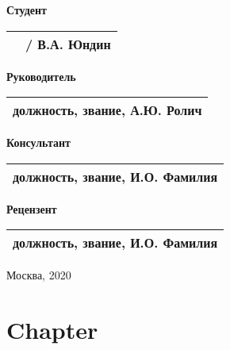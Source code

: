 \documentclass[a4paper,14pt]{extreport} %
\begin{document}
	\begin{multicols}{2}
		\noindent
		\textbf{Студент}
		
		\vspace{4mm}
		
		\noindent
		\begin{tabularx}{\linewidth}{Xc}
			& / В.А. Юндин \\
			\hline
		\end{tabularx}
		
		\columnbreak
		
		\noindent
		\textbf{Руководитель}
		
		\vspace{4mm}
		
		\noindent
		\begin{tabularx}{\linewidth}{c}
			должность, звание, А.Ю. Ролич \\
			\hline
		\end{tabularx}
	
		\vspace{8mm}
	
		\noindent
		\textbf{Консультант}
		
		\vspace{4mm}
		
		\noindent
		\begin{tabularx}{\linewidth}{c}
			должность, звание, И.О. Фамилия \\
			\hline
		\end{tabularx}
	
		\vspace{8mm}
		
		\noindent
		\textbf{Рецензент}
		
		\vspace{4mm}
		
		\noindent
		\begin{tabularx}{\linewidth}{c}
			должность, звание, И.О. Фамилия \\
			\hline
		\end{tabularx}
	\end{multicols}

	\vfill
	\begin{center}Москва, 2020\end{center}

	\restoregeometry
	\newpage
	
	\chapter{Chapter}
	
\end{document}

